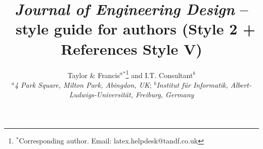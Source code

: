 \documentclass[]{cJEN2e}
\begin{document}
  




\title{{\itshape Journal of Engineering Design} -- \LaTeXe\ style guide
for authors (Style 2 + References Style V)}

\author{Taylor \& Francis$^{a}$$^{\ast}$\thanks{$^\ast$Corresponding author. Email: latex.helpdesk@tandf.co.uk
\vspace{6pt}} and I.T. Consultant$^{b}$\\\vspace{6pt}  $^{a}${\em{4 Park Square, Milton Park, Abingdon, UK}};
$^{b}${\em{Institut f\"{u}r Informatik, Albert-Ludwigs-Universit\"{a}t, Freiburg,
Germany}}\\\vspace{6pt} }

\maketitle
\end{document}
